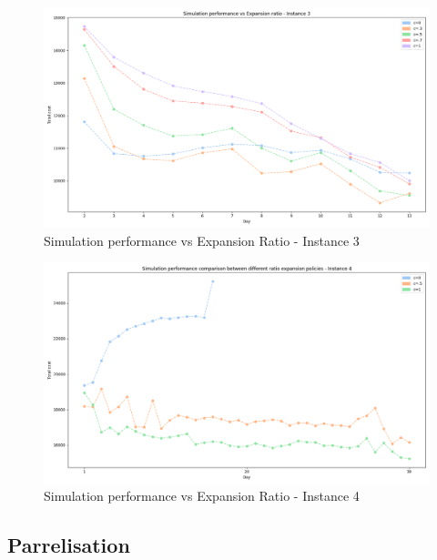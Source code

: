 \begin{figure}[!ht]
    \centering
    \includegraphics[width=\textwidth]{Figures/3 - Simulation performance vs Expansion ratio.png}
    \caption{Simulation performance vs Expansion Ratio - Instance 3}
    \label{fig:sim_perf_vs_c_3}
\end{figure}

\begin{figure}[!ht]
    \centering
    \includegraphics[width=\textwidth]{Figures/4 - Simulation performance vs Expansion ratio.png}
    \caption{Simulation performance vs Expansion Ratio - Instance 4}
    \label{fig:sim_perf_vs_c_4}
\end{figure}
\subsection{Parrelisation}

